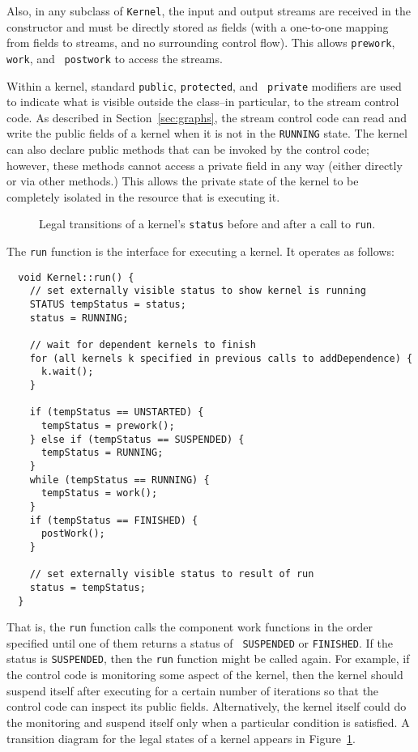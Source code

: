 Also, in any subclass of {\tt Kernel}, the input and output streams
are received in the constructor and must be directly stored as fields
(with a one-to-one mapping from fields to streams, and no surrounding
control flow).  This allows {\tt prework}, {\tt work}, and {\tt
postwork} to access the streams.

Within a kernel, standard {\tt public}, {\tt protected}, and {\tt
private} modifiers are used to indicate what is visible outside the
class--in particular, to the stream control code.  As described in
Section~\ref{sec:graphs}, the stream control code can read and write
the public fields of a kernel when it is not in the {\tt RUNNING}
state.  The kernel can also declare public methods that can be invoked
by the control code; however, these methods cannot access a private
field in any way (either directly or via other methods.)  This allows
the private state of the kernel to be completely isolated in the
resource that is executing it.


\begin{figure}[t]
\begin{center}
\end{center}
\vspace{-12pt}
\caption{Legal transitions of a kernel's {\tt status} before and after
a call to {\tt run}.\protect\label{fig:kernel-status}}
\end{figure}

The {\tt run} function is the interface for executing a kernel.  It
operates as follows: {\small
\begin{verbatim}
  void Kernel::run() {
    // set externally visible status to show kernel is running
    STATUS tempStatus = status;
    status = RUNNING;

    // wait for dependent kernels to finish
    for (all kernels k specified in previous calls to addDependence) {
      k.wait();
    }

    if (tempStatus == UNSTARTED) {
      tempStatus = prework();
    } else if (tempStatus == SUSPENDED) {
      tempStatus = RUNNING;
    }
    while (tempStatus == RUNNING) {
      tempStatus = work();
    }
    if (tempStatus == FINISHED) {
      postWork();
    }

    // set externally visible status to result of run
    status = tempStatus;
  } 
\end{verbatim}}
That is, the {\tt run} function calls the component work functions in
the order specified until one of them returns a status of {\tt
SUSPENDED} or {\tt FINISHED}.  If the status is {\tt SUSPENDED}, then
the {\tt run} function might be called again.  For example, if the
control code is monitoring some aspect of the kernel, then the kernel
should suspend itself after executing for a certain number of
iterations so that the control code can inspect its public fields.
Alternatively, the kernel itself could do the monitoring and suspend
itself only when a particular condition is satisfied.  A transition
diagram for the legal states of a kernel appears in
Figure~\ref{fig:kernel-status}.

